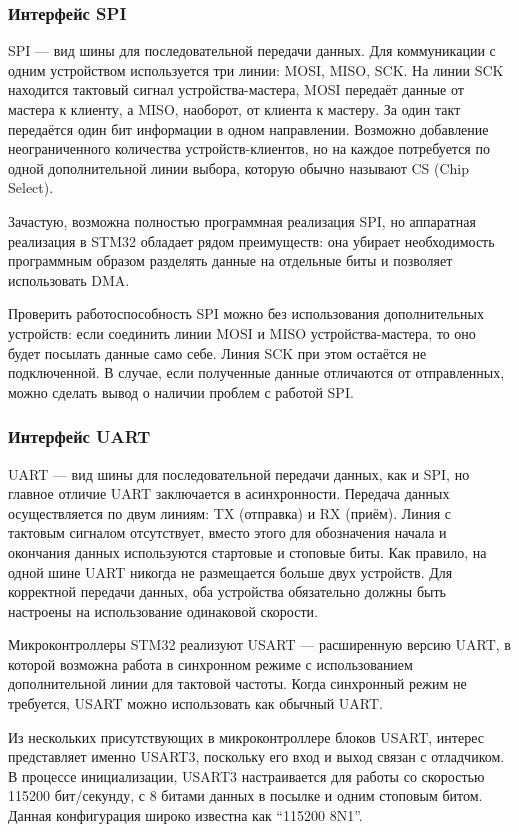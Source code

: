 \documentclass[rusmathsym, eqnumwithinsec, amspack, hyperref]{bomgost}
\begin{document}
\subsubsection{Интерфейс SPI}

SPI --- вид шины для последовательной передачи данных. Для коммуникации с одним устройством используется три линии: MOSI, MISO, SCK. На линии SCK находится тактовый сигнал устройства-мастера, MOSI передаёт данные от мастера к клиенту, а MISO, наоборот, от клиента к мастеру. За один такт передаётся один бит информации в одном направлении. Возможно добавление неограниченного количества устройств-клиентов, но на каждое потребуется по одной дополнительной линии выбора, которую обычно называют CS (Chip Select).

Зачастую, возможна полностью программная реализация SPI, но аппаратная реализация в STM32 обладает рядом преимуществ: она убирает необходимость программным образом разделять данные на отдельные биты и позволяет использовать DMA.

Проверить работоспособность SPI можно без использования дополнительных устройств: если соединить линии MOSI и MISO устройства-мастера, то оно будет посылать данные само себе. Линия SCK при этом остаётся не подключенной. В случае, если полученные данные отличаются от отправленных, можно сделать вывод о наличии проблем с работой SPI.

\subsubsection{Интерфейс UART}

UART --- вид шины для последовательной передачи данных, как и SPI, но главное отличие UART заключается в асинхронности. Передача данных осуществляется по двум линиям: TX (отправка) и RX (приём). Линия с тактовым сигналом отсутствует, вместо этого для обозначения начала и окончания данных используются стартовые и стоповые биты. Как правило, на одной шине UART никогда не размещается больше двух устройств. Для корректной передачи данных, оба устройства обязательно должны быть настроены на использование одинаковой скорости.

Микроконтроллеры STM32 реализуют USART --- расширенную версию UART, в которой возможна работа в синхронном режиме с использованием дополнительной линии для тактовой частоты. Когда синхронный режим не требуется, USART можно использовать как обычный UART.

Из нескольких присутствующих в микроконтроллере блоков USART, интерес представляет именно USART3, поскольку его вход и выход связан с отладчиком. В процессе инициализации, USART3 настраивается для работы со скоростью 115200 бит/секунду, с 8 битами данных в посылке и одним стоповым битом. Данная конфигурация широко известна как ``115200 8N1''. 
\end{document}
